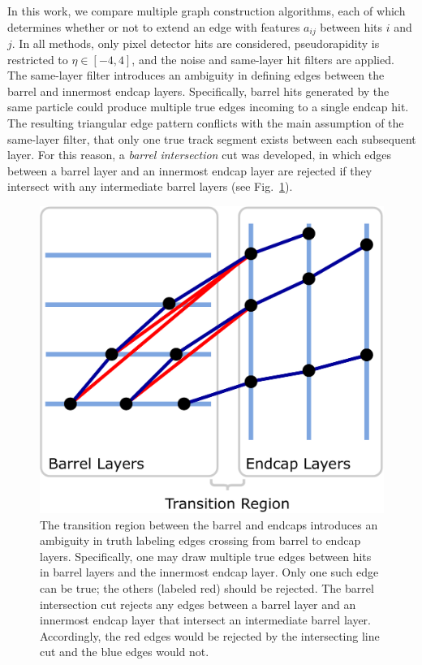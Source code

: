 \documentclass[twocolumn]{svjour3}
\begin{document}
In this work, we compare multiple graph construction algorithms, each of which determines whether or not to extend an edge with features $a_{ij}$ between hits $i$ and $j$. 
In all methods, only pixel detector hits are considered, pseudorapidity is restricted to $\eta\in[-4,4]$, and 
the noise and same-layer hit filters are applied. 
The same-layer filter introduces an ambiguity in defining edges between the barrel and innermost endcap layers. 
Specifically, barrel hits generated by the same particle could produce multiple true edges incoming to a single endcap hit. 
The resulting triangular edge pattern conflicts with the main assumption of the same-layer filter, that only one true track segment exists between each subsequent layer. 
For this reason, a \textit{barrel intersection} cut was developed, in which edges between a barrel layer and an innermost endcap layer are rejected if they intersect with any intermediate barrel layers (see Fig.~\ref{fig:intersecting_line_cut}). 

\begin{figure}[!htbp]
\centering
\includegraphics[width=0.7\columnwidth]{intersecting_line_cut.pdf}
\caption{The transition region between the barrel and endcaps introduces an ambiguity in truth labeling edges crossing from barrel to endcap layers. 
Specifically, one may draw multiple true edges between hits in barrel layers and the innermost endcap layer. 
Only one such edge can be true; the others (labeled red) should be rejected. 
The barrel intersection cut rejects any edges between a barrel layer and an innermost endcap layer that intersect an intermediate barrel layer. 
Accordingly, the red edges would be rejected by the intersecting line cut and the blue edges would not.}
\label{fig:intersecting_line_cut} 
\end{figure}
\end{document}
